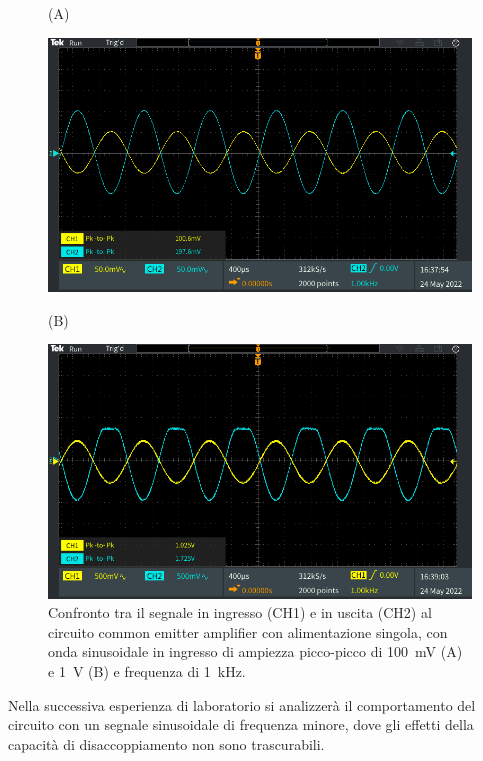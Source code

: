 \begin{figure}[h!]
	\centering
	(A)
	
	\includegraphics[width=0.7\linewidth]{./ImageFiles/Laboratorio 3/TEK00010}
	\vspace{1cm}
	
	(B)
	
	\includegraphics[width=0.7\linewidth]{./ImageFiles/Laboratorio 3/TEK00011}
	\caption{Confronto tra il segnale in ingresso (CH1) e in uscita (CH2) al circuito common emitter amplifier con alimentazione singola, con onda sinusoidale in ingresso di ampiezza picco-picco di \SI{100}{\milli\volt} (A) e \SI{1}{\volt} (B) e frequenza di \SI{1}{\kilo\hertz}.}
	\label{fig:commonemitter_se_guadagno}
\end{figure}

Nella successiva esperienza di laboratorio si analizzerà il comportamento del circuito con un segnale sinusoidale di frequenza minore, dove gli effetti della capacità di disaccoppiamento non sono trascurabili.